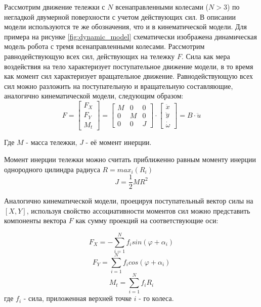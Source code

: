 \documentclass[oneside,final,14pt]{extreport}
\begin{document}
Рассмотрим движение тележки с $N$ всенаправленными колесами ($N > 3$) по негладкой двумерной поверхности с учетом действующих сил. В описании модели используются те же обозначения, что и в кинематической модели. Для примера на рисунке \ref{fig:dynamic_model} схематически изображена динамическая модель робота с тремя всенаправленными колесами. Рассмотрим равнодействующую всех сил, действующих на тележку $F$. Сила как мера воздействия на тело характеризует поступательное движение модели, в то время как момент сил характеризует вращательное движение. Равнодействующую всех сил можно разложить на поступательную и вращательную составляющие, аналогично кинематической модели, следующим образом:
\begin{equation}
F
=
\begin{bmatrix}
F_{X} \\
F_{Y} \\
M_{t}
\end{bmatrix}
=
\begin{bmatrix}
M & 0 & 0 \\
0 & M & 0 \\
0 & 0 & J
\end{bmatrix}
\cdot
\begin{bmatrix}
\ddot{x} \\
\ddot{y} \\
\dot{\omega}
\end{bmatrix}
=
B \cdot \ddot{u}
\end{equation}

Где $M$ - масса тележки, $J$ - её момент инерции. 

\begin{figure}[H]
\end{figure}
Момент инерции тележки можно считать приближенно равным моменту инерции однородного цилиндра радиуса $R=max_{i}(R_{i})$ 
\begin{equation}
J
=
\frac{1}{2}
MR^{2}
\end{equation}



Аналогично кинематической модели,
проецируя поступательный вектор силы на $[X,Y]$,  используя свойство ассоциативности моментов сил
можно представить компоненты вектора $F$ как сумму проекций на соответствующие оси:

\begin{equation}
F_{X}
=
-
\sum_{i=1}^{N}f_{i} sin(\varphi +\alpha_{i})
\end{equation}
\begin{equation}
F_{Y}
=
\sum_{i=1}^{N}f_{i} cos(\varphi +\alpha_{i})
\end{equation}
\begin{equation}
M_{t}
=
\sum_{i=1}^{N}f_{i}R_{i}
\end{equation}
где $f_{i}$ - сила, приложенная верхней точке $i$ - го колеса. 
\end{document}
